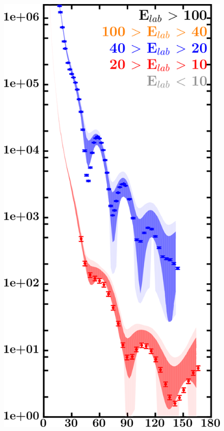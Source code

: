 \documentclass[twocolumn,secnumarabic,amssymb, nobibnotes, aps, prl,
superscriptaddress, nobalancelastpage, draft]{revtex4}
\begin{document}
\begin{figure}[!htb]
    \centering
    \begin{minipage}{0.4\linewidth}
        \centering
        \includegraphics[width=\linewidth]{figures/sn112_protonElastic.png}
        \label{DOM_sn112_proton_elastic}
    \end{minipage}\hspace{6pt}

\end{figure}
\end{document}
